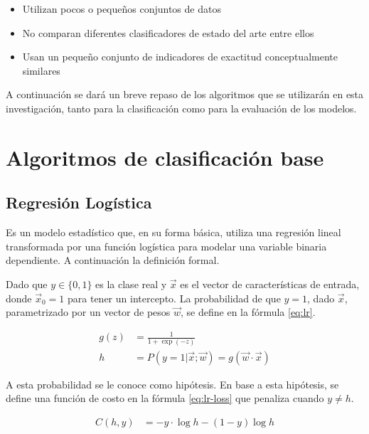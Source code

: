 \begin{itemize}
	\item Utilizan pocos o pequeños conjuntos de datos
	\item No comparan diferentes clasificadores de estado del arte entre ellos
	\item Usan un pequeño conjunto de indicadores de exactitud conceptualmente similares
\end{itemize}

A continuación se dará un breve repaso de los algoritmos que se utilizarán en esta investigación, tanto para la clasificación como para la evaluación de los modelos.

\section{Algoritmos de clasificación base}

\subsection{Regresión Logística}

Es un modelo estadístico que, en su forma básica, utiliza una regresión lineal transformada por una función logística para modelar una variable binaria dependiente. A continuación la definición formal.

Dado que $y\in \{0, 1\}$ es la clase real y $\vec{x}$ es el vector de características de entrada, donde $\vec{x}_0 = 1$ para tener un intercepto. La probabilidad de que $y=1$, dado $\vec{x}$, parametrizado por un vector de pesos $\vec{w}$,
se define en la fórmula \ref{eq:lr}.

\begin{equation}
	\label{eq:lr}
\begin{split}
	g(z) &= \frac{1}{1 + \exp(-z) } \\
	h &= P(y=1|\vec{x};\vec{w}) = g(\vec{w}\cdot\vec{x})
\end{split}
\end{equation}

A esta probabilidad se le conoce como hipótesis. En base a esta hipótesis, se define una función de costo en la fórmula \ref{eq:lr-loss} que penaliza cuando $y \ne h$.

\begin{equation}
	\label{eq:lr-loss}
\begin{split}
	C(h, y) &= -y \cdot \log{h} - (1-y) \log{h}
\end{split}
\end{equation}

